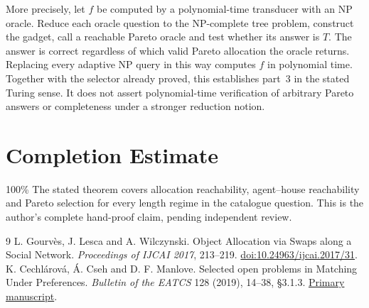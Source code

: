 \documentclass[11pt]{article}
\begin{document}
More precisely, let $f$ be computed by a polynomial-time transducer
with an NP oracle. Reduce each oracle question to the NP-complete tree
problem, construct the gadget, call a reachable Pareto oracle and test
whether its answer is $T$. The answer is correct regardless of which
valid Pareto allocation the oracle returns. Replacing every adaptive NP
query in this way computes $f$ in polynomial time. Together with the
selector already proved, this establishes part~3 in the stated Turing
sense. It does not assert polynomial-time verification of arbitrary
Pareto answers or completeness under a stronger reduction notion.

\section*{Completion Estimate}
100\%
The stated theorem covers allocation reachability, agent--house reachability
and Pareto selection for every length regime in the catalogue question.
This is the author's complete hand-proof claim, pending independent review.

\begin{thebibliography}{9}
L. Gourv\`es, J. Lesca and A. Wilczynski.
Object Allocation via Swaps along a Social Network.
\emph{Proceedings of IJCAI 2017}, 213--219.
\href{https://doi.org/10.24963/ijcai.2017/31}{doi:10.24963/ijcai.2017/31}.
K. Cechl\'arov\'a, \'A. Cseh and D. F. Manlove.
Selected open problems in Matching Under Preferences.
\emph{Bulletin of the EATCS} 128 (2019), 14--38, \S3.1.3.
\href{https://hpi.de/friedrich/docs/publications/2019/BEATCS.pdf}{Primary manuscript}.
\end{thebibliography}
\end{document}
